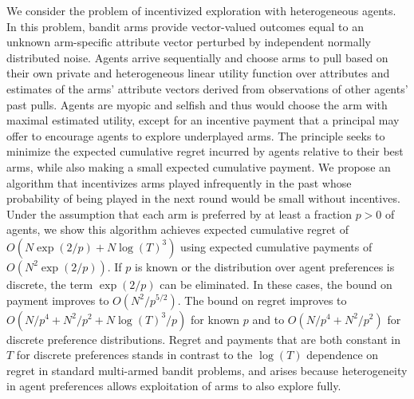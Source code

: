 We consider the problem of incentivized exploration with heterogeneous agents.
In this problem, bandit arms provide vector-valued outcomes equal to an unknown
arm-specific attribute vector perturbed by independent normally distributed
noise.  Agents arrive sequentially and choose arms to pull based on their own
private and heterogeneous linear utility function over attributes and estimates
of the arms' attribute vectors derived from observations of other agents' past
pulls.  Agents are myopic and selfish and thus would choose the arm with
maximal estimated utility, except for an incentive payment that a principal may
offer to encourage agents to explore underplayed arms.  The principle seeks to
minimize the expected cumulative regret incurred by agents relative to their
best arms, while also making a small expected cumulative payment.  We propose
an algorithm that incentivizes arms played infrequently in the
past whose probability of being played in the next round would be small
without incentives.  Under the assumption that each arm is preferred by at
least a fraction $p>0$ of agents, we show this algorithm achieves expected
cumulative regret of $O(N\exp(2/p) + N \log(T)^3)$ using expected cumulative
payments of $O(N^2 \exp(2/p))$.  If $p$ is known or the distribution over agent
preferences is discrete, the term $\exp(2/p)$ can be eliminated.  In these
cases, the bound on payment improves to $O(N^2 / p^{5/2})$.  The bound on
regret improves to $O(N/p^4 + N^2/p^2 + N \log(T)^3 / p)$ for known $p$ and to
$O(N/p^4 + N^2/p^2)$ for discrete preference distributions.  Regret and
payments that are both constant in $T$ for discrete preferences stands
in contrast to the $\log(T)$ dependence on regret in standard multi-armed bandit
problems, and arises because heterogeneity in agent preferences allows
exploitation of arms to also explore fully.
